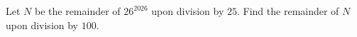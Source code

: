 Let $N$ be the remainder of $26^{2026}$ upon division by $25$. Find the remainder of $N$ upon division by $100$.
